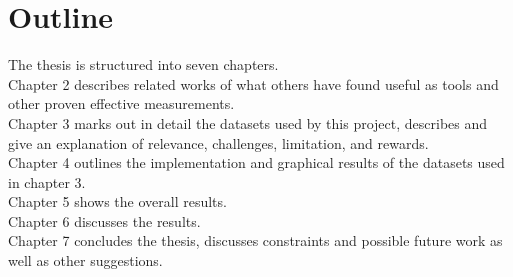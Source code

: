 \newpage
\section{Outline}
The thesis is structured into seven chapters.
\newline \\Chapter 2 describes related works of what others have found useful as tools and other proven effective measurements.
\newline \\Chapter 3 marks out in detail the datasets used by this project, describes and give an explanation of relevance, challenges, limitation, and rewards.
\newline \\Chapter 4 outlines the implementation and graphical results of the datasets used in chapter 3.
\newline \\Chapter 5 shows the overall results.
\newline \\Chapter 6 discusses the results.
\newline \\Chapter 7 concludes the thesis, discusses constraints and possible future work as well as other suggestions.